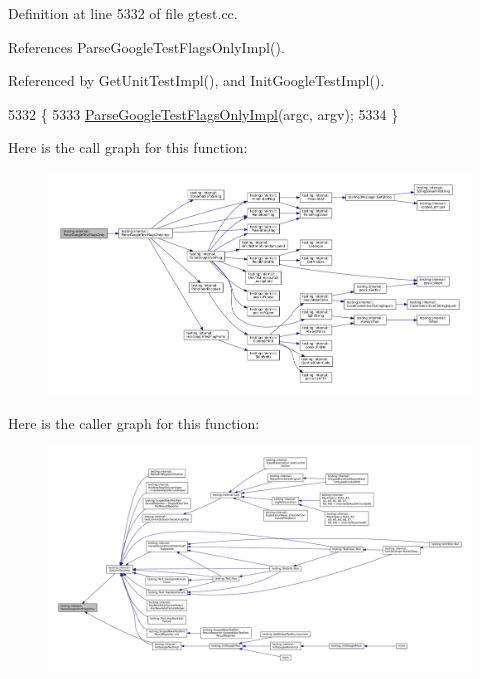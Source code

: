 Definition at line 5332 of file gtest.\+cc.



References Parse\+Google\+Test\+Flags\+Only\+Impl().



Referenced by Get\+Unit\+Test\+Impl(), and Init\+Google\+Test\+Impl().


\begin{DoxyCode}
5332                                                       \{
5333   \hyperlink{namespacetesting_1_1internal_ae4c46ce8c3d016848fff52cc5133f2ac}{ParseGoogleTestFlagsOnlyImpl}(argc, argv);
5334 \}
\end{DoxyCode}
Here is the call graph for this function\+:
\nopagebreak
\begin{figure}[H]
\begin{center}
\leavevmode
\includegraphics[width=350pt]{namespacetesting_1_1internal_a472880afbcc592a41e3d623e2dec8412_cgraph}
\end{center}
\end{figure}
Here is the caller graph for this function\+:
\nopagebreak
\begin{figure}[H]
\begin{center}
\leavevmode
\includegraphics[width=350pt]{namespacetesting_1_1internal_a472880afbcc592a41e3d623e2dec8412_icgraph}
\end{center}
\end{figure}
\mbox{\label{namespacetesting_1_1internal_aa3c81a67914856448d0778990d9d9cab}} 
